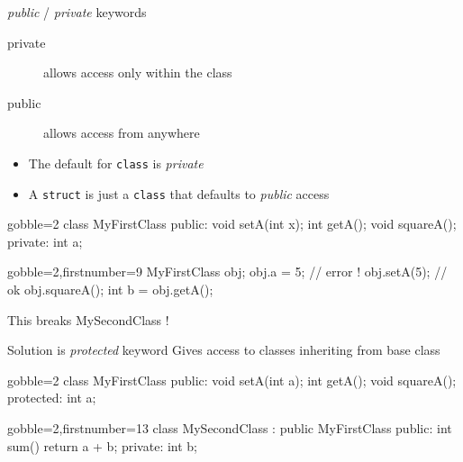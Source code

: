 \begin{frame}[fragile]
  \begin{block}{{\it public} \color{white} / {\it private} keywords}
    \begin{description}
      \item[private] allows access only within the class
      \item[public] allows access from anywhere
    \end{description}
    \begin{itemize}
       \item The default for \texttt{class} is {\it private}
       \item A \texttt{struct} is just a \texttt{class} that defaults to {\it public} access
    \end{itemize}
  \end{block}
  \pause
  \begin{multicols}{2}
    \begin{cppcode*}{gobble=2}
      class MyFirstClass {
      public:
        void setA(int x);
        int getA();
        void squareA();
      private:
        int a;
      }
    \end{cppcode*}
    \columnbreak
    \begin{cppcode*}{gobble=2,firstnumber=9}
      MyFirstClass obj;
      obj.a = 5;   // error !
      obj.setA(5); // ok
      obj.squareA();
      int b = obj.getA();
    \end{cppcode*}
    \pause
    \begin{tcolorbox}[left=0mm,right=0mm,top=0mm,bottom=0mm,colback=red!5!white,colframe=red!75!black]
      This breaks MySecondClass !
    \end{tcolorbox}
  \end{multicols}
\end{frame}

\begin{frame}[fragile]
  \begin{block}{Solution is {\it protected} keyword}
    Gives access to classes inheriting from base class
  \end{block}
  \begin{multicols}{2}
    \begin{cppcode*}{gobble=2}
      class MyFirstClass {
      public:
        void setA(int a);
        int getA();
        void squareA();
      protected:
        int a;
      }
    \end{cppcode*}
    \columnbreak
    \begin{cppcode*}{gobble=2,firstnumber=13}
      class MySecondClass :
        public MyFirstClass {
      public:
        int sum() {
          return a + b;
        }
      private:
        int b;
      }
    \end{cppcode*}
  \end{multicols}
\end{frame}

